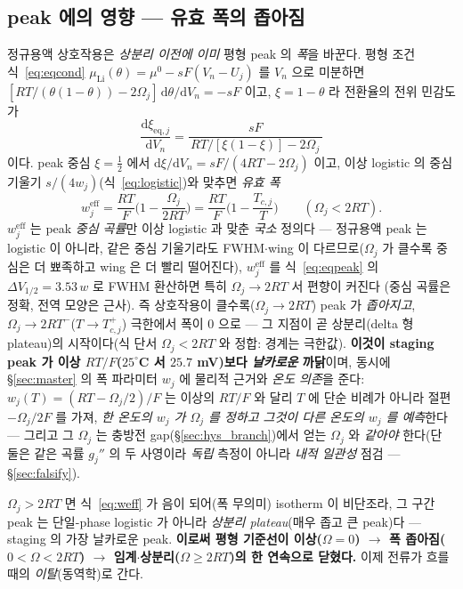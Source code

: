 \documentclass[11pt,a4paper]{article}
\newcommand{\dd}{\mathrm{d}}
\newcommand{\eff}{\mathrm{eff}}
\newcommand{\eq}{\mathrm{eq}}
\begin{document}
\subsection{peak 에의 영향 — 유효 폭의 좁아짐}
정규용액 상호작용은 \emph{상분리 이전에 이미} 평형 peak 의 \emph{폭}을 바꾼다. 평형 조건 식~\eqref{eq:eqcond}
$\mu_\mathrm{Li}(\theta)=\mu^0-sF(V_n-U_j)$ 를 $V_n$ 으로 미분하면 $[RT/(\theta(1-\theta))-2\Omega_j]\,\dd\theta/\dd V_n=-sF$
이고, $\xi=1-\theta$ 라 전환율의 전위 민감도가
\begin{equation}
\frac{\dd\xi_{\eq,j}}{\dd V_n}=\frac{sF}{\,RT/[\xi(1-\xi)]-2\Omega_j\,}
\label{eq:regsol_slope}
\end{equation}
이다. peak 중심 $\xi=\tfrac12$ 에서 $\dd\xi/\dd V_n=sF/(4RT-2\Omega_j)$ 이고, 이상 logistic 의 중심 기울기
$s/(4w_j)$(식~\eqref{eq:logistic})와 맞추면 \emph{유효 폭}
\begin{equation}
\boxed{\;w_j^\eff=\frac{RT}{F}\Big(1-\frac{\Omega_j}{2RT}\Big)=\frac{RT}{F}\Big(1-\frac{T_{c,j}}{T}\Big)\qquad(\Omega_j<2RT).\;}
\label{eq:weff}
\end{equation}
$w_j^\eff$ 는 peak \emph{중심 곡률}만 이상 logistic 과 맞춘 \emph{국소} 정의다 — 정규용액 peak 는 logistic 이 아니라,
같은 중심 기울기라도 FWHM$\cdot$wing 이 다르므로($\Omega_j$ 가 클수록 중심은 더 뾰족하고 wing 은 더 빨리 떨어진다),
$w_j^\eff$ 를 식~\eqref{eq:eqpeak} 의 $\Delta V_{1/2}=3.53\,w$ 로 FWHM 환산하면 특히 $\Omega_j\to2RT$ 서 편향이 커진다
(중심 곡률은 정확, 전역 모양은 근사). 즉 상호작용이 클수록($\Omega_j\to2RT$) peak 가 \emph{좁아지고},
$\Omega_j\to2RT^-$($T\to T_{c,j}^+$) 극한에서 폭이 $0$ 으로 — 그 지점이 곧 상분리(delta 형 plateau)의 시작이다(식 단서
$\Omega_j<2RT$ 와 정합: 경계는 극한값). \textbf{이것이
staging peak 가 이상 $RT/F$($25^\circ$C 서 $25.7$ mV)보다 \emph{날카로운} 까닭}이며, 동시에 \S\ref{sec:master} 의 폭
파라미터 $w_j$ 에 물리적 근거와 \emph{온도 의존}을
준다: $w_j(T)=(RT-\Omega_j/2)/F$ 는 이상의 $RT/F$ 와 달리 $T$ 에 단순 비례가 아니라 절편 $-\Omega_j/2F$ 를 가져,
\emph{한 온도의 $w_j$ 가 $\Omega_j$ 를 정하고 그것이 다른 온도의 $w_j$ 를 예측}한다 — 그리고 그 $\Omega_j$ 는
충방전 gap(\S\ref{sec:hys_branch})에서 얻는 $\Omega_j$ 와 \emph{같아야} 한다(단 둘은 같은 곡률 $g_j''$ 의 두 사영이라
\emph{독립} 측정이 아니라 \emph{내적 일관성} 점검 — \S\ref{sec:falsify}).

$\Omega_j>2RT$ 면 식~\eqref{eq:weff} 가 음이 되어(폭 무의미) isotherm 이 비단조라, 그 구간 peak 는 단일-phase
logistic 가 아니라 \emph{상분리 plateau}(매우 좁고 큰 peak)다 — staging 의 가장 날카로운 peak. \textbf{이로써 평형
기준선이 이상($\Omega=0$) $\to$ 폭 좁아짐($0<\Omega<2RT$) $\to$ 임계$\cdot$상분리($\Omega\ge2RT$)의 한 연속으로
닫혔다.} 이제 전류가 흐를 때의 \emph{이탈}(동역학)로 간다.
\end{document}
